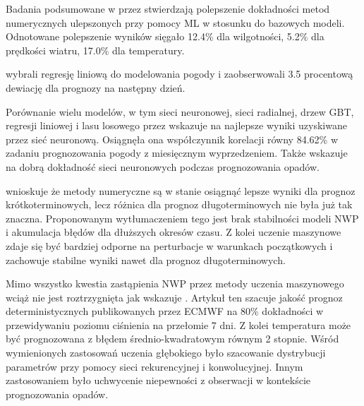 Badania podsumowane w  przez  
\cite{ai-revolutionises-weather-prediction}
stwierdzają polepszenie dokładności metod numerycznych ulepszonych przy
pomocy ML w stosunku do bazowych modeli. Odnotowane polepszenie wyników
sięgało 12.4\% dla wilgotności, 5.2\% dla prędkości wiatru, 17.0\% dla
temperatury.

\cite{weather-monitoring-using-artificial-intelligence}
wybrali regresję liniową do modelowania pogody i zaobserwowali 3.5 procentową
dewiację dla prognozy na następny dzień.

Porównanie wielu modelów, w tym sieci neuronowej, sieci radialnej, 
drzew GBT, regresji liniowej i lasu losowego przez 
\cite{developing-machine-learning-algorithms} wskazuje na 
najlepsze wyniki uzyskiwane przez sieć neuronową. Osiągnęła ona 
współczynnik korelacji równy 84.62\% w zadaniu prognozowania
pogody z miesięcznym wyprzedzeniem. Także  
\cite{weather-forecasting-using-dl} wskazuje na dobrą dokładność
sieci neuronowych podczas prognozowania opadów.

\cite{ml-applied-to-weather-forecasting} wnioskuje że metody 
numeryczne są w stanie osiągnąć lepsze wyniki dla prognoz 
krótkoterminowych, lecz różnica dla prognoz długoterminowych
nie była już tak znaczna. Proponowanym wytłumaczeniem tego jest
brak stabilności modeli NWP i akumulacja błędów dla dłuższych 
okresów czasu. Z kolei uczenie maszynowe zdaje się być bardziej
odporne na perturbacje w warunkach początkowych i zachowuje 
stabilne wyniki nawet dla prognoz długoterminowych.

Mimo wszystko kwestia zastąpienia NWP przez metody uczenia maszynowego
wciąż nie jest roztrzygnięta jak wskazuje 
\cite{can-dl-beat-numerical}. Artykuł ten szacuje jakość prognoz 
deterministycznych publikowanych przez ECMWF na 80\% dokładności w przewidywaniu
poziomu ciśnienia na przełomie 7 dni. Z kolei temperatura może być 
prognozowana z błędem średnio-kwadratowym równym 2 stopnie. Wśród wymienionych
zastosowań uczenia głębokiego było szacowanie dystrybucji parametrów przy pomocy 
sieci rekurencyjnej i konwolucyjnej. Innym zastosowaniem było uchwycenie
niepewności z obserwacji w kontekście prognozowania opadów.

